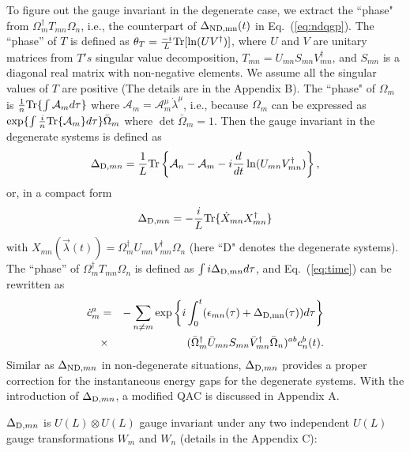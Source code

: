 \documentclass[aps,pra,twocolumn,groupedaddress,10pt]{revtex4}
\def\be{\begin{equation}} \def\ee{\end{equation}}
\def\nn{\nonumber}
\begin{document}
To figure out the gauge invariant in the degenerate case, we extract
the ``phase" from $\Omega_{m}^{\dag}T_{mn}\Omega_{n}$, i.e., the
counterpart of $\Delta_{\rm ND, mn}(t)$ in Eq.~(\ref{eq:ndqgp}).
The ``phase'' of $T$ is defined as $\theta_T= \frac{-i}{L}
{\rm{Tr}} [{\ln(UV^\dag)}]$, where $U$ and $V$ are unitary matrices
from $T's$ singular value decomposition,
$T_{mn} = U_{mn}S_{mn}V_{mn}^{\dag}$, and $S_{mn}$ is
a diagonal real matrix with non-negative elements.
We assume all the singular values of $T$ are positive
(The details are in the Appendix B).
The ``phase" of $\Omega_{m}$ is $\frac{1}{n} {\rm{Tr}}\{\int\mathcal{A}_{m}
d\tau\}$ where $\mathcal{A}_{m}= \mathcal{A}^\mu_{m} \dot{\lambda}^{\mu}$,
i.e., because $\Omega_{m}$ can be expressed as
$\exp \{\int \frac{i}{n} {\rm{Tr}}\{\mathcal{A}_{m}\}d\tau\}\bar{\Omega}_{m}$
where $\det\bar{\Omega}_{m}=1$.
Then the gauge invariant in the degenerate systems is defined as
\be
\Delta_{{\rm{D}},mn} = \frac{1}{L}  {\rm{Tr}}
\left\{\mathcal{A}_{n}-\mathcal{A}_{m}-i\frac{d}{dt}\ln(U_{mn}V_{mn}^\dag)
\right\},
\label{delta}
\ee
or, in a compact form
\begin{equation}
	\Delta_{{\rm{D}},mn} = -\frac{i}{L} {\rm{Tr}}\{\dot{X}_{mn}X_{mn}^{\dag}\}
\label{moregeneral}
\end{equation}
with $X_{mn}(\vec{\lambda}(t)) = \Omega_{m}^{\dag}U_{mn}V_{mn}^{\dag}\Omega_{n}$
(here ``D" denotes the degenerate systems).
The ``phase'' of $\Omega_m^{\dag} T_{mn} \Omega_n$ is defined as
$\int i\Delta_{{\rm{D}},mn} d\tau$, and Eq.~(\ref{eq:time})
can be rewritten as
\begin{eqnarray}\label{mean}
\dot{c}_{m}^{a} &=& - \sum_{n\neq m}
\exp \left \{i\int_0^t(\epsilon_{mn}(\tau)+\Delta_{\rm{D},mn}(\tau)) d\tau
\right \} \nn \\
&\times& (\bar{\Omega}_m^\dag \bar{U}_{mn}S_{mn}\bar{V}_{mn}^\dag
\bar{\Omega}_n)^{ab}c_{n}^{b}(t).
\end{eqnarray}
Similar as $\Delta_{{\rm{ND}},mn}$ in non-degenerate situations,
$\Delta_{{\rm{D}},mn}$ provides a proper correction for the
instantaneous energy gaps for the degenerate systems.
With the introduction of $\Delta_{{\rm{D}},mn}$, a modified QAC
is discussed in Appendix A.

$\Delta_{{\rm D},mn}$ is $U(L)\otimes U(L)$  gauge invariant under any
two independent $U(L)$ gauge transformations $W_{m}$ and $W_{n}$
(details in the Appendix C):
\end{document}
